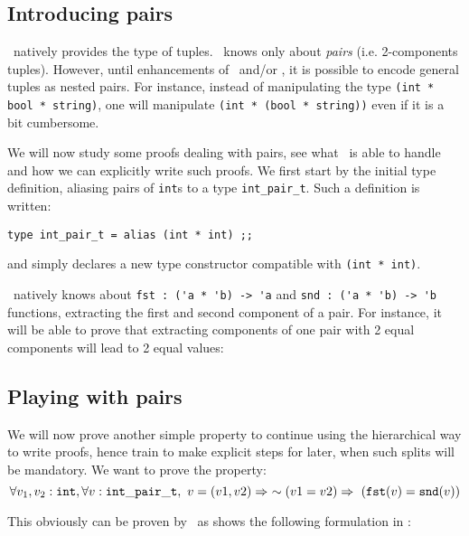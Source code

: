 \documentclass[11pt,a4paper,twoside,onecolumn,fullpage]{article}
\begin{document}
\subsection{Introducing pairs}

\focal\ natively provides the type of tuples. \zenon\ knows only about
{\em pairs} (i.e. 2-components tuples). However, until enhancements of
\focal\ and/or \zenon, it is possible to encode general tuples as
nested pairs. For instance, instead of manipulating the type
\lstinline"(int * bool * string)", one will manipulate
\lstinline"(int * (bool * string))" even if it is a bit cumbersome.

\medskip
We will now study some proofs dealing with pairs, see what \zenon\ is
able to handle and how we can explicitly write such proofs. We first
start by the initial type definition, aliasing pairs of
\lstinline"int"s to a type \lstinline"int_pair_t". Such a definition
is written:

{\scriptsize
\begin{lstlisting}
type int_pair_t = alias (int * int) ;;
\end{lstlisting}}

\noindent and simply declares a new type constructor compatible with
\lstinline "(int * int)".

\zenon\ natively knows about \lstinline"fst : ('a * 'b) -> 'a" and
\lstinline"snd : ('a * 'b) -> 'b" functions, extracting the first and
second component of a pair. For instance, it will be able to prove
that extracting components of one pair with 2 equal components will lead
to 2 equal values:

{\scriptsize
}



\subsection{Playing with pairs}

We will now prove another simple property to continue using the hierarchical way
to write proofs, hence train to make explicit steps for later, when
such splits will be mandatory. We want to prove the property:
$$
\forall v_1, v_2 : {\tt int}, \forall v : {\tt int\_pair\_t},
\ v = (v1, v2) \Rightarrow\ \sim (v1 = v2) \Rightarrow ~ ({\tt fst} (v) = {\tt snd} (v))
$$

This obviously can be proven by \zenon\ as shows the following
formulation in \focal:
\end{document}

